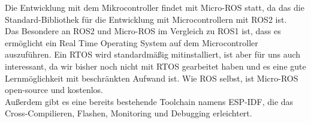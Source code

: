 \begin{flushleft}
    Die Entwicklung mit dem Mikrocontroller findet mit Micro-ROS statt, da das die Standard-Bibliothek für die Entwicklung mit Microcontrollern mit ROS2 ist.\\
    Das Besondere an ROS2 und Micro-ROS im Vergleich zu ROS1 ist, dass es ermöglicht ein Real Time Operating System auf dem Microcontroller auszuführen. Ein RTOS wird standardmäßig mitinstalliert, ist aber für uns auch interessant, da wir bisher noch nicht mit RTOS gearbeitet haben und es eine gute Lernmöglichkeit mit beschränkten Aufwand ist.
    Wie ROS selbst, ist Micro-ROS open-source und kostenlos.\\
    Außerdem gibt es eine bereits bestehende Toolchain namens ESP-IDF, die das Cross-Compilieren, Flashen, Monitoring und Debugging erleichtert.

\end{flushleft}